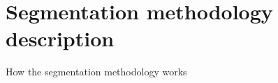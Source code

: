 \graphicspath{ {./content/metho/figures/} }

\section{Segmentation methodology description} 

How the segmentation methodology works

